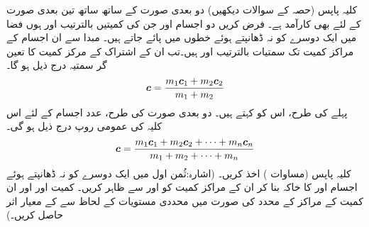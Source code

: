 کلیہ پاپس  (حصہ  کے سوالات دیکھیں)   دو بعدی صورت  کے ساتھ ساتھ تین بعدی صورت  کے لئے بھی کارآمد ہے۔ فرض کریں دو اجسام  اور  جن کی  کمیتیں   بالترتیب  اور  ہوں  فضا میں ایک دوسرے کو  نہ ڈھانپتے ہوئے خطوں  میں پائے جاتے ہیں۔ مبدا سے ان اجسام کے مراکز کمیت تک سمتیات بالترتیب  اور  ہیں۔تب ان کے اشتراک    کے مرکز کمیت کا تعین گر سمتیہ درج ذیل ہو گا۔
\begin{align}\label{مساوات_بالکثرت_کلیہ_تین_بعدی_کلیہ_پاپس_الف}
{\ensuremath{{\boldsymbol{c}}}}=\frac{m_1{{\boldsymbol{c}}}_1+m_2{{\boldsymbol{c}}}_2}{m_1+m_2}
\end{align}
پہلے کی طرح، اس کو  کہتے ہیں۔ دو بعدی صورت کی طرح،   عدد اجسام کے لئے   اس کلیہ کی عمومی روپ درج ذیل ہو گی۔
\begin{align}\label{مساوات_بالکثرت_کلیہ_تین_بعدی_کلیہ_پاپس_ب}
{\ensuremath{{\boldsymbol{c}}}}=\frac{m_1{{\boldsymbol{c}}}_1+m_2{{\boldsymbol{c}}}_2+\cdots+m_n{{\boldsymbol{c}}}_n}{m_1+m_2+\cdots+m_n}
\end{align}
کلیہ پاپس (مساوات  ) اخذ کریں۔ (اشارہ:ثُمن اول میں ایک دوسرے کو نہ ڈھانپتے ہوئے اجسام  اور  کا خاکہ بنا کر ان کے مراکز کمیت کو  اور  سے ظاہر کریں۔ کمیت  اور  اور ان کمیت کے مراکز کے محدد  کی صورت میں محددی مستویات کے لحاظ سے  کے  معیار اثر حاصل کریں۔)


